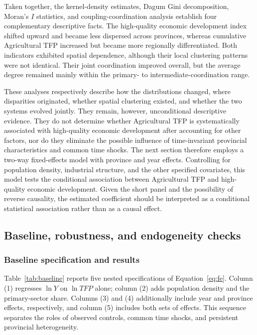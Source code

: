 \documentclass[sustainability,article,submit,moreauthors]{Definitions/mdpi}
\numberwithin{equation}{section}
\begin{document}
Taken together, the kernel-density estimates, Dagum Gini decomposition, Moran's
$I$ statistics, and coupling-coordination analysis establish four complementary
descriptive facts. The high-quality economic development index shifted upward
and became less dispersed across provinces, whereas cumulative Agricultural TFP
increased but became more regionally differentiated. Both indicators exhibited
spatial dependence, although their local clustering patterns were not identical.
Their joint coordination improved overall, but the average degree remained
mainly within the primary- to intermediate-coordination range.

These analyses respectively describe how the distributions changed, where
disparities originated, whether spatial clustering existed, and whether the two
systems evolved jointly. They remain, however, unconditional descriptive
evidence. They do not determine whether Agricultural TFP is systematically
associated with high-quality economic development after accounting for other
factors, nor do they eliminate the possible influence of time-invariant
provincial characteristics and common time shocks. The next section therefore
employs a two-way fixed-effects model with province and year effects. Controlling
for population density, industrial structure, and the other specified
covariates, this model tests the conditional association between Agricultural
TFP and high-quality economic development. Given the short panel and the
possibility of reverse causality, the estimated coefficient should be
interpreted as a conditional statistical association rather than as a causal
effect.

\FloatBarrier
\subsection{Baseline, robustness, and endogeneity checks}

\subsubsection{Baseline specification and results}

Table~\ref{tab:baseline} reports five nested specifications of
Equation~\ref{eq:fe}. Column (1) regresses $\ln Y$ on $\ln TFP$ alone;
column (2) adds population density and the primary-sector share.
Columns (3) and (4) additionally include year and province effects,
respectively, and column (5) includes both sets of effects.
This sequence separates the roles of observed controls, common time
shocks, and persistent provincial heterogeneity.
\end{document}
